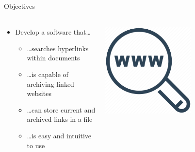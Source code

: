 \documentclass[
    ngerman,%
    authorontitle=true,
]{bfhbeamer}
\begin{document}
    \begin{frame}{Objectives}
        \framesubtitle{}
        \begin{columns} %
            \begin{column}{0.5\textwidth} %
                \begin{itemize}
                    \item Develop a software that\ldots
                    \begin{itemize}
                        \item \ldots searches hyperlinks within documents
                        \item \ldots is capable of archiving linked websites
                        \item \ldots can store current and archived links in a file
                        \item \ldots is easy and intuitive to use
                    \end{itemize}
                \end{itemize}
            \end{column}
            \begin{column}{0.3\textwidth} %
                \includegraphics[width=0.6\textwidth]{pictures/lupe}
            \end{column}
        \end{columns}
    \end{frame}
\end{document}

